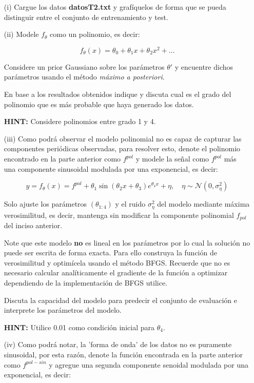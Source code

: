 \documentclass[11pt,letterpaper]{article}
\begin{document}
\begin{itemize}
	\item[(i)] Cargue los datos \textbf{datosT2.txt} y grafíquelos de forma que se pueda distinguir entre el conjunto de entrenamiento y test.
	
	\item[(ii)] Modele $f_\theta$ como un polinomio, es decir: 

	$$f_\theta(x)=\theta_0+\theta_1x+\theta_2x^2+\ldots$$
	
	Considere un prior Gaussiano sobre los parámetros $\theta'$ y encuentre dichos parámetros usando el método \textit{máximo a posteriori}.
	
	En base a los resultados obtenidos indique y discuta cual es el grado del polinomio que es más probable que haya generado los datos.
	
	\noindent \textbf{HINT:} Considere polinomios entre grado 1 y 4.
	
	\item[(iii)]  Como podrá observar el modelo polinomial no es capaz de capturar las componentes periódicas observadas, para resolver esto, denote el polinomio encontrado en la parte anterior como $f^{pol}$ y modele la señal como $f^{pol}$ más una componente sinusoidal modulada por una exponencial, es decir:
	
	$$ y = f_\theta(x) = f^{pol} + \theta_1\sin(\theta_2x + \theta_3)e^{\theta_4x}+\eta,\quad \eta \sim \mathcal{N}(0,\sigma_\eta^2)$$
	
	Solo ajuste los parámetros $(\theta_{1:4})$ y el ruido $\sigma_{\eta}^2$ del modelo mediante máxima verosimilitud, es decir, mantenga sin modificar la componente polinomial $f_{pol}$ del inciso anterior.

	Note que este modelo \textbf{no} es lineal en los parámetros por lo cual la solución no puede ser escrita de forma exacta. Para ello construya la función de verosimilitud y optimícela usando el método BFGS. Recuerde que no es necesario calcular analíticamente el gradiente de la función a optimizar dependiendo de la implementación de BFGS utilice.
    
    Discuta la capacidad del modelo para predecir el conjunto de evaluación e interprete los parámetros del modelo.
	
	\noindent \textbf{HINT:} Utilice 0.01 como condición inicial para $\theta_4$.
	
	\item[(iv)] Como podrá notar, la 'forma de onda' de los datos no es puramente sinusoidal, por esta razón, denote la función encontrada en la parte anterior como $f^{pol-sin}$ y agregue una segunda componente senoidal modulada por una exponencial, es decir:
	

\end{itemize}
\end{document}
